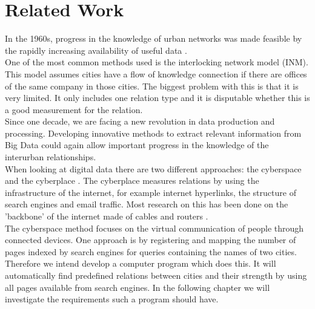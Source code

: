 \section{Related Work}
In the 1960s, progress in the knowledge of urban networks was made feasible by the rapidly increasing availability of useful data \cite{tornqvist1968flows}. \\
One of the most common methods used is the interlocking network model (INM)\cite{taylor2012interlocking}. This model assumes cities have a flow of knowledge connection if there are offices of the same company in those cities. The biggest problem with this is that it is very limited. It only includes one relation type and it is disputable whether this is a good measurement for the relation. \\

Since one decade, we are facing a new revolution in data production and processing. Developing innovative methods to extract relevant information from Big Data could again allow important progress in the knowledge of the interurban relationships. \\

When looking at digital data there are two different approaches: the cyberspace and the cyberplace \cite{devriendt2008cyberplace}. The cyberplace measures relations by using the infrastructure of the internet, for example internet hyperlinks, the structure of search engines and email traffic. Most research on this has been done on the 'backbone' of the internet made of cables and routers \cite{choi2006comparing, gorman2000networks}. \\

The cyberspace method focuses on the virtual communication of people through connected devices. One approach is by registering and mapping the number of pages indexed by search engines for queries containing the names of two cities\cite{devriendt2008cyberplace, janc2015visibility, janc2015geography}. 
 \\

Therefore we intend develop a computer program which does this. It will automatically find predefined relations between cities and their strength by using all pages available from search engines. In the following chapter we will investigate the requirements such a program should have.

